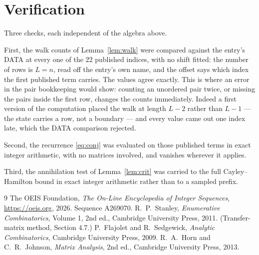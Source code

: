\documentclass[11pt,a4paper]{article}
\theoremstyle{plain}
\theoremstyle{definition}
\begin{document}
\section{Verification}

Three checks, each independent of the algebra above.

First, the walk counts of Lemma~\ref{lem:walk} were compared against the entry's DATA at
every one of the $22$ published indices, with no shift fitted: the number of rows is
$L=n$, read off the entry's own name, and the offset says which index the first
published term carries. The values agree exactly. This is where an error in the pair
bookkeeping would show: counting an unordered pair twice, or missing the pairs inside the
first row, changes the counts immediately. Indeed a first version of the computation
placed the walk at length $L-2$ rather than $L-1$ --- the state carries a row, not a
boundary --- and every value came out one index late, which the DATA comparison rejected.

Second, the recurrence \eqref{eq:conj} was evaluated on those published terms in exact
integer arithmetic, with no matrices involved, and vanishes wherever it applies.

Third, the annihilation test of Lemma~\ref{lem:crit} was carried to the full
Cayley--Hamilton bound in exact integer arithmetic rather than to a sampled prefix.

\begin{thebibliography}{9}
 The OEIS Foundation, \emph{The On-Line Encyclopedia of Integer
Sequences}, \url{https://oeis.org}, 2026. Sequence A269070.
 R.~P.~Stanley, \emph{Enumerative Combinatorics}, Volume 1, 2nd ed.,
Cambridge University Press, 2011. (Transfer-matrix method, Section 4.7.)
 P.~Flajolet and R.~Sedgewick, \emph{Analytic Combinatorics}, Cambridge
University Press, 2009.
 R.~A.~Horn and C.~R.~Johnson, \emph{Matrix Analysis}, 2nd ed., Cambridge
University Press, 2013.
\end{thebibliography}
\end{document}
